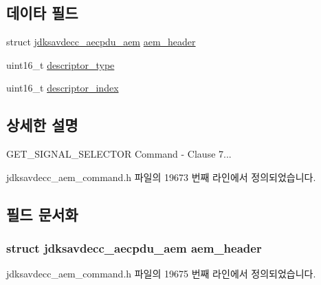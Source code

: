 \subsection*{데이타 필드}
\begin{DoxyCompactItemize}
\item 
struct \hyperlink{structjdksavdecc__aecpdu__aem}{jdksavdecc\+\_\+aecpdu\+\_\+aem} \hyperlink{structjdksavdecc__aem__command__get__signal__selector_ae1e77ccb75ff5021ad923221eab38294}{aem\+\_\+header}
\item 
uint16\+\_\+t \hyperlink{structjdksavdecc__aem__command__get__signal__selector_ab7c32b6c7131c13d4ea3b7ee2f09b78d}{descriptor\+\_\+type}
\item 
uint16\+\_\+t \hyperlink{structjdksavdecc__aem__command__get__signal__selector_a042bbc76d835b82d27c1932431ee38d4}{descriptor\+\_\+index}
\end{DoxyCompactItemize}


\subsection{상세한 설명}
G\+E\+T\+\_\+\+S\+I\+G\+N\+A\+L\+\_\+\+S\+E\+L\+E\+C\+T\+OR Command -\/ Clause 7... 

jdksavdecc\+\_\+aem\+\_\+command.\+h 파일의 19673 번째 라인에서 정의되었습니다.



\subsection{필드 문서화}
\subsubsection[{\texorpdfstring{aem\+\_\+header}{aem_header}}]{\setlength{\rightskip}{0pt plus 5cm}struct {\bf jdksavdecc\+\_\+aecpdu\+\_\+aem} aem\+\_\+header}\hypertarget{structjdksavdecc__aem__command__get__signal__selector_ae1e77ccb75ff5021ad923221eab38294}{}\label{structjdksavdecc__aem__command__get__signal__selector_ae1e77ccb75ff5021ad923221eab38294}


jdksavdecc\+\_\+aem\+\_\+command.\+h 파일의 19675 번째 라인에서 정의되었습니다.

